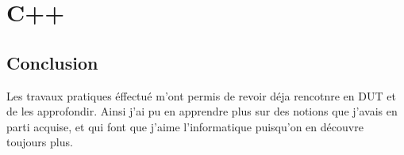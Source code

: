 \documentclass[12pt,a4paper]{book} %
\begin{document}
\part{C++}






%


\cleardoublepage %

\pagestyle{empty}


\chapter*{Conclusion}

Les travaux pratiques éffectué m'ont permis de revoir déja rencotnre en DUT et de les approfondir. Ainsi j'ai pu en apprendre plus sur des notions que j'avais en parti acquise, et qui font que j'aime l'informatique puisqu'on en découvre toujours plus.

\pagestyle{fancy}

\end{document}
